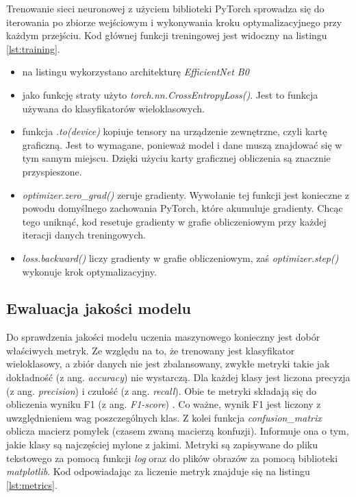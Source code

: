 Trenowanie sieci neuronowej z użyciem biblioteki PyTorch sprowadza się do iterowania po zbiorze wejściowym i wykonywania kroku optymalizacyjnego przy każdym przejściu.
Kod głównej funkcji treningowej jest widoczny na listingu \ref{lst:training}.

\begin{itemize}
    \item na listingu wykorzystano architekturę \textit{EfficientNet B0}
    \item jako funkcję straty użyto \textit{torch.nn.CrossEntropyLoss()}.
    Jest to funkcja używana do klasyfikatorów wieloklasowych.
    \item funkcja \textit{.to(device)} kopiuje tensory na urządzenie zewnętrzne, czyli kartę graficzną.
    Jest to wymagane, ponieważ model i dane muszą znajdować się w tym samym miejscu.
    Dzięki użyciu karty graficznej obliczenia są znacznie przyspieszone.
    \item \textit{optimizer.zero\_grad()} zeruje gradienty.
    Wywołanie tej funkcji jest konieczne z powodu domyślnego zachowania PyTorch, które akumuluje gradienty.
    Chcąc tego uniknąć, kod resetuje gradienty w grafie obliczeniowym przy każdej iteracji danych treningowych.
    \item \textit{loss.backward()} liczy gradienty w grafie obliczeniowym, zaś \textit{optimizer.step()} wykonuje krok optymalizacyjny.
\end{itemize}



\subsection{Ewaluacja jakości modelu}

Do sprawdzenia jakości modelu uczenia maszynowego konieczny jest dobór właściwych metryk.
Ze względu na to, że trenowany jest klasyfikator wieloklasowy, a zbiór danych nie jest zbalansowany, zwykłe metryki takie jak dokładność (z ang. \textit{accuracy}) nie wystarczą.
Dla każdej klasy jest liczona precyzja (z ang. \textit{precision}) i czułość (z ang. \textit{recall}).
Obie te metryki składają się do obliczenia wyniku F1 (z ang. \textit{F1-score}) \cite{geron}.
Co ważne, wynik F1 jest liczony z uwzględnieniem wag poszczególnych klas.
Z kolei funkcja \textit{confusion\_matrix} oblicza macierz pomyłek (czasem zwaną macierzą konfuzji).
Informuje ona o tym, jakie klasy są najczęściej mylone z jakimi.
Metryki są zapisywane do pliku tekstowego za pomocą funkcji \textit{log} oraz do plików obrazów za pomocą biblioteki \textit{matplotlib}.
Kod odpowiadając za liczenie metryk znajduje się na listingu \ref{lst:metrics}.


